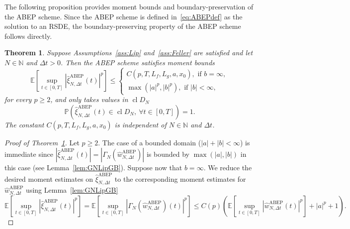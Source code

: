 \documentclass[11pt]{amsart}
\newtheorem{theorem}{Theorem}
\newcommand{\E}{{\mathbb E}}
\newcommand{\PP}{{\mathbb P}}
\newcommand{\CDDN}{\operatorname{cl} D_{N}}
\newcommand{\xiNDt}{\hat{\xi}_{N,\Delta t}}
\newcommand{\ABEP}{\textrm{ABEP}}
\begin{document}
{The following proposition provides moment bounds and boundary-preservation of the ABEP scheme. Since the ABEP scheme is defined in~\eqref{eq:ABEPdef} as the solution to an RSDE, the boundary-preserving property of the ABEP scheme follows directly. 
\begin{theorem}\label{th:ABEPmomBounds}
Suppose Assumptions~\ref{ass:Lip} and~\ref{ass:Feller} are satisfied and let $N \in \mathbb{N}$ and $\Delta t>0$. Then the ABEP scheme satisfies moment bounds
\begin{equation*}
\E \left[ \sup_{t \in [0,T]} \left| \hat{\xi}^{\ABEP}_{N,\Delta t}(t)\right|^{p} \right] \leq
\begin{cases}
C(p,T,L_{f},L_{g},a,x_{0}), \text{ if } b = \infty,\\
\max(|a|^{p},|b|^{p}), \text{ if } |b| < \infty,
\end{cases}
\end{equation*}
for every $p \geq 2$, and only takes values in $\CDDN$
\begin{equation*}
\PP \left( \hat{\xi}^{\ABEP}_{N,\Delta t}(t) \in \CDDN,\ \forall t \in [0,T] \right)= 1.
\end{equation*}
The constant $C(p,T,L_{f},L_{g},a,x_{0})$ is independent of $N \in \mathbb{N}$ and $\Delta t$.
\end{theorem}
\begin{proof}[Proof of Theorem~\ref{th:ABEPmomBounds}]
Let $p \geq 2$. The case of a bounded domain ($|a| + |b| < \infty$) is immediate since $|\xiNDt^{\ABEP}(t)| = |\Gamma_{N}(\hat{w}_{N,\Delta t}^{\ABEP})|$ is bounded by $\max(|a|,|b|)$ in this case (see Lemma~\ref{lem:GNLipGB}). Suppose now that $b=\infty$. We reduce the desired moment estimates on $\xiNDt^{\ABEP}$ to the corresponding moment estimates for $\hat{w}_{N,\Delta t}^{\ABEP}$ using Lemma~\ref{lem:GNLipGB}
\begin{equation*}
\E \left[ \sup_{t \in [0,T]} \left| \hat{\xi}_{N,\Delta t}^{\ABEP}(t)\right|^{p} \right] = \E \left[ \sup_{t \in [0,T]} \left| \Gamma_{N} \left(\hat{w}_{N,\Delta t}^{\ABEP}\right)(t) \right|^{p} \right] \leq C(p) \left( \E \left[ \sup_{t \in [0,T]} \left| \hat{w}_{N,\Delta t}^{\ABEP}(t) \right|^{p} \right] + |a|^{p} + 1 \right).
\end{equation*}


\end{proof}}
\end{document}
